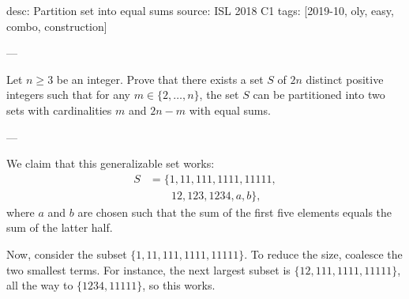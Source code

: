desc: Partition set into equal sums
source: ISL 2018 C1
tags: [2019-10, oly, easy, combo, construction]

---

Let $n\ge 3$ be an integer. Prove that there exists a set $S$ of $2n$ distinct positive integers such that for any $m\in\{2,\ldots,n\}$, the set $S$ can be partitioned into two sets with cardinalities $m$ and $2n-m$ with equal sums.

---

We claim that this generalizable set works:
\begin{align*}
    S&=\{1,11,111,1111,11111,\\
    &\qquad 12,123,1234,a,b\},
\end{align*}
where $a$ and $b$ are chosen such that the sum of the first five elements equals the sum of the latter half.

Now, consider the subset $\{1,11,111,1111,11111\}$. To reduce the size, coalesce the two smallest terms. For instance, the next largest subset is $\{12,111,1111,11111\}$, all the way to $\{1234,11111\}$, so this works.
